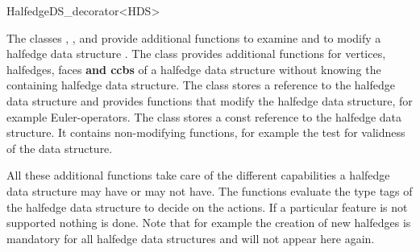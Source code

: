 
\ccRefPageBegin



\begin{ccRefClass}{HalfedgeDS_decorator<HDS>}

\ccDefinition
  
The classes ,
, and
 provide additional functions
to examine and to modify a halfedge data structure . The class
 provides additional functions
for vertices, halfedges, faces {\bf\ttfamily and ccbs} of a halfedge data structure
without knowing the containing halfedge data structure. The class
 stores a reference to the halfedge
data structure and provides functions that modify the halfedge data
structure, for example Euler-operators. The class
 stores a const reference to
the halfedge data structure. It contains non-modifying functions, for
example the test for validness of the data structure.

All these additional functions take care of the different capabilities
a halfedge data structure may have or may not have.  The functions
evaluate the type tags of the halfedge data structure to decide on the
actions. If a particular feature is not supported nothing is done.
Note that for example the creation of new halfedges is mandatory for
all halfedge data structures and will not appear here again.


\ccInheritsFrom


\ccCreation
{}

\ccThreeToTwo


\end{ccRefClass}
